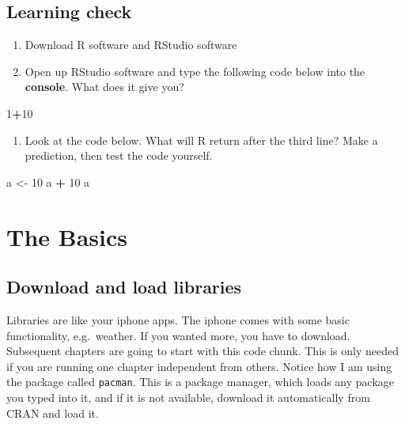 \documentclass[
]{book}
\newenvironment{Shaded}{\begin{snugshade}}{\end{snugshade}}
\newcommand{\DecValTok}[1]{\textcolor[rgb]{0.00,0.00,0.81}{#1}}
\newcommand{\NormalTok}[1]{#1}
\newcommand{\OperatorTok}[1]{\textcolor[rgb]{0.81,0.36,0.00}{\textbf{#1}}}
\newcommand{\StringTok}[1]{\textcolor[rgb]{0.31,0.60,0.02}{#1}}
\providecommand{\tightlist}{%
  \setlength{\itemsep}{0pt}\setlength{\parskip}{0pt}}
\begin{document}
\hypertarget{learning-check}{%
\section*{Learning check}\label{learning-check}}

\begin{enumerate}
\def\labelenumi{\arabic{enumi}.}
\item
  Download R software and RStudio software
\item
  Open up RStudio software and type the following code below into the \textbf{console}. What does it give you?
\end{enumerate}

\begin{Shaded}
\begin{Highlighting}[]
\DecValTok{1}\OperatorTok{+}\DecValTok{10}
\end{Highlighting}
\end{Shaded}

\begin{enumerate}
\def\labelenumi{\arabic{enumi}.}
\setcounter{enumi}{2}
\tightlist
\item
  Look at the code below. What will R return after the third line? Make a prediction, then test the code yourself.
\end{enumerate}

\begin{Shaded}
\begin{Highlighting}[]
\NormalTok{a <-}\StringTok{ }\DecValTok{10}
\NormalTok{a }\OperatorTok{+}\StringTok{ }\DecValTok{10}
\NormalTok{a}
\end{Highlighting}
\end{Shaded}

\hypertarget{basics}{%
\chapter{The Basics}\label{basics}}

\hypertarget{download-and-load-libraries}{%
\section{Download and load libraries}\label{download-and-load-libraries}}

Libraries are like your iphone apps. The iphone comes with some basic functionality, e.g.~weather. If you wanted more, you have to download. Subsequent chapters are going to start with this code chunk. This is only needed if you are running one chapter independent from others. Notice how I am using the package called \texttt{pacman}. This is a package manager, which loads any package you typed into it, and if it is not available, download it automatically from CRAN and load it.
\end{document}
